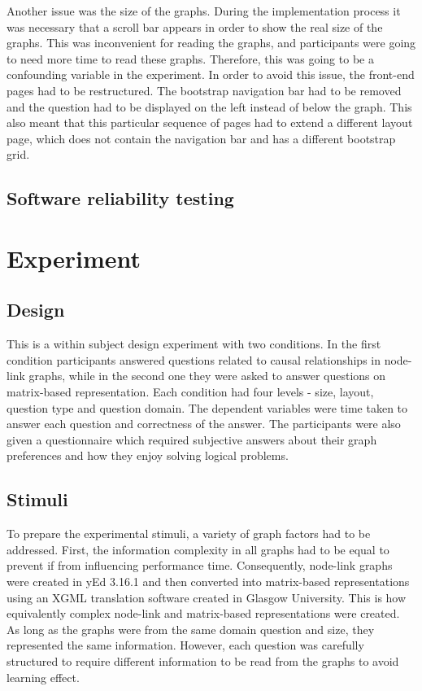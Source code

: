 \documentclass{l4proj}
\begin{document}
Another issue was the size of the graphs. During the implementation process it was necessary that a scroll bar appears in order to show the real size of the graphs. This was inconvenient for reading the graphs, and participants were going to need more time to read these graphs. Therefore, this was going to be a confounding variable in the experiment. In order to avoid this issue, the front-end pages had to be restructured. The bootstrap navigation bar had to be removed and the question had to be displayed on the left instead of below the graph. This also meant that this particular sequence of pages had to extend a different layout page, which does not contain the navigation bar and has a different bootstrap grid.

\section{Software reliability testing}

\chapter{Experiment}
\section{Design}

This is a within subject design experiment with two conditions. In the first condition participants answered questions related to causal relationships in node-link graphs, while in the second one they were asked to answer questions on matrix-based representation. Each condition had four levels - size, layout, question type and question domain. The dependent variables were time taken to answer each question and correctness of the answer. The participants were also given a questionnaire which required subjective answers about their graph preferences and how they enjoy solving logical problems. 

\section{Stimuli}

To prepare the experimental stimuli, a variety of graph factors had to be addressed. First, the information complexity in all graphs had to be equal to prevent if from influencing performance time. Consequently, node-link graphs were created in yEd 3.16.1 and then converted into matrix-based representations using an XGML translation software created in Glasgow University. This is how equivalently complex node-link and matrix-based representations were created. As long as the graphs were from the same domain question and size, they represented the same information. However, each question was carefully structured to require different information to be read from the graphs to avoid learning effect. 
\end{document}
